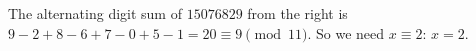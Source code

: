 The alternating digit sum of $15076829$ from the right is $9-2+8-6+7-0+5-1=20\equiv9\pmod{11}$. So we need $x\equiv2$: $x=\boxed{2}$.
